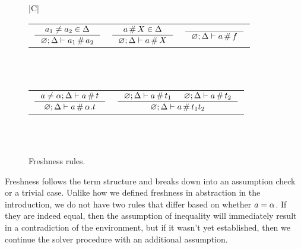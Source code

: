 \documentclass[english, mgr]{iithesis}
\newcommand{\solverRule}{\vdash}
\begin{document}
\begin{figure}[htbp]
    \centering
    \begin{tabularx}{\textwidth}{|C|}
      \hline \\
      \begin{tabular}{ccc}
      $
      \inference{
        \atomv_1 \cneq \atomv_2 \in \icEnv
      }{
        \emptyenv ; \icEnv \solverRule \atomv_1 \cfresh \atomv_2
      }
      $ & $
      \inference{
        \atomv \cfresh \termv \in \icEnv
      }{
        \emptyenv ; \icEnv \solverRule \atomv \cfresh \termv
      }
      $ & $
      \inference{
      }{
        \emptyenv ; \icEnv \solverRule \atomv \cfresh \symb
      }
      $
      \end{tabular}
      \\ \\
      \begin{tabular}{cc}
      $
      \inference{
        \atomv \cneq \atomexp ; \icEnv \solverRule \atomv \cfresh \term
      }{
        \emptyenv ; \icEnv \solverRule \atomv \cfresh \tbind{\atomexp}{\term}
      }
      $ &
      $
      \inference{
        \emptyenv ; \icEnv \solverRule \atomv \cfresh \term_1
        &
        \emptyenv ; \icEnv \solverRule \atomv \cfresh \term_2
      }{
        \emptyenv ; \icEnv \solverRule \atomv \cfresh \term_1 \term_2
      }
      $
      \end{tabular}
      \\ \\ \hline
      \end{tabularx}
  \caption{Freshness rules.}
  \label{fig:freshness-rules}
\end{figure}
Freshness follows the term structure and breaks down into an assumption check or a trivial case.
Unlike how we defined freshness in abstraction in the introduction,
we do not have two rules that differ based on whether $a = \alpha$.
If they are indeed equal, then the assumption of inequality will immediately
result in a contradiction of the environment, but if it wasn't yet established,
then we continue the solver procedure with an additional assumption.
\end{document}
